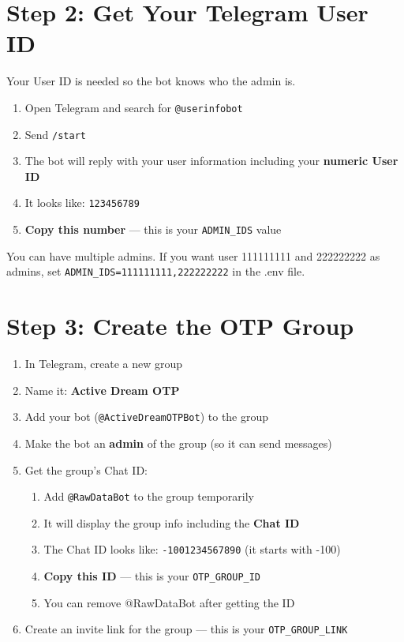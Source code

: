 \section{Step 2: Get Your Telegram User ID}

Your User ID is needed so the bot knows who the admin is.

\begin{enumerate}
    \item Open Telegram and search for \texttt{@userinfobot}
    \item Send \texttt{/start}
    \item The bot will reply with your user information including your \textbf{numeric User ID}
    \item It looks like: \texttt{123456789}
    \item \textbf{Copy this number} --- this is your \texttt{ADMIN\_IDS} value
\end{enumerate}

\begin{tipbox}
You can have multiple admins. If you want user 111111111 and 222222222 as admins, set \texttt{ADMIN\_IDS=111111111,222222222} in the .env file.
\end{tipbox}

\section{Step 3: Create the OTP Group}

\begin{enumerate}
    \item In Telegram, create a new group
    \item Name it: \textbf{Active Dream OTP}
    \item Add your bot (\texttt{@ActiveDreamOTPBot}) to the group
    \item Make the bot an \textbf{admin} of the group (so it can send messages)
    \item Get the group's Chat ID:
    \begin{enumerate}
        \item Add \texttt{@RawDataBot} to the group temporarily
        \item It will display the group info including the \textbf{Chat ID}
        \item The Chat ID looks like: \texttt{-1001234567890} (it starts with -100)
        \item \textbf{Copy this ID} --- this is your \texttt{OTP\_GROUP\_ID}
        \item You can remove @RawDataBot after getting the ID
    \end{enumerate}
    \item Create an invite link for the group --- this is your \texttt{OTP\_GROUP\_LINK}
\end{enumerate}

